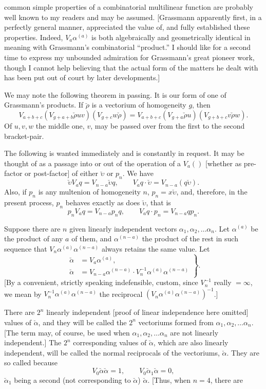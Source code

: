 \documentclass[11pt]{article}
\begin{document}
common simple properties of a combinatorial multilinear function are probably well known to my readers and may be assumed. [Grassmann apparently first, in a perfectly general manner, appreciated the value of, and fully established these properties. Indeed, $V_a\alpha^{(a)}$ is both algebraically and geometrically identical in meaning with Grassmann's combinatorial ``product.'' I should like for a second time to express my unbounded admiration for Grassmann's great pioneer work, though I cannot help believing that the actual form of the matters he dealt with has been put out of court by later developments.]

\indent We may note the following theorem in passing. It is our form of one of Grassmann's products. If $\breve\rho$ is a vectorium of homogeneity $g$, then
\[V_{a+b+c}(V_{g+a+b}\breve\rho uv)(V_{g+c}w\breve\rho)=V_{a+b+c}(V_{g+a}\breve\rho u)(V_{g+b+c}v\breve\rho w).\]
Of $u,v,w$ the middle one, $v$, may be passed over from the first to the second bracket-pair.


\indent The following is wanted immediately and is constantly in request. It may be thought of as a passage into or out of the operation of a $V_a()$ [whether as pre-factor or post-factor] of either $\breve\upsilon$ or $p_n$. We have
\[\breve\upsilon V_aq=V_{n-a}\breve\upsilon q,\qquad V_aq\cdot\breve\upsilon=V_{n-a}(q\breve\upsilon).\]
Also, if $p_n$ is any multenion of homogeneity $n$, $p_n=x\breve\upsilon$, and, therefore, in the present process, $p_n$ behaves exactly as does $\breve\upsilon$, that is
\[p_nV_aq=V_{n-a}p_nq,\qquad V_aq\cdot p_n=V_{n-a}qp_n.\]

\indent Suppose there are $n$ given linearly independent vectors $\alpha_1,\alpha_2,\ldots\alpha_n$. Let $\alpha^{(a)}$ be the product of any $a$ of them, and $\alpha^{(n-a)}$ the product of the rest in such sequence that $V_n\alpha^{(a)}\alpha^{(n-a)}$ always retains the same value. Let
\begin{equation}\left.\begin{aligned}\breve\alpha&=V_a\alpha^{(a)},\\\breve\alpha&=V_{n-a}\alpha^{(n-a)}\cdot V_n^{-1}\alpha^{(a)}\alpha^{(n-a)}\end{aligned}\right\}.\tag{1}\end{equation}
[By a convenient, strictly speaking indefensible, custom, since $V_n^{-1}$ really $=\infty$, we mean by $V_n^{-1}\alpha^{(a)}\alpha^{(n-a)}$ the reciprocal $(V_n\alpha^{(a)}\alpha^{(n-a)})^{-1}$.]

\indent There are $2^n$ linearly independent [proof of linear independence here omitted] values of $\breve\alpha$, and they will be called the $2^n$ vectoriums formed from $\alpha_1,\alpha_2,\ldots\alpha_n$. [The term may, of course, be used when $\alpha_1,\alpha_2,\ldots\alpha_n$ are not linearly independent.] The $2^n$ corresponding values of $\breve\alpha$, which are also linearly independent, will be called the normal reciprocals of the vectoriums, $\breve\alpha$. They are so called because
\[V_0\breve\alpha\breve\alpha=1,\qquad V_0\breve\alpha_1\breve\alpha=0,\]
$\breve\alpha_1$ being a second (not corresponding to $\breve\alpha$) $\breve\alpha$. [Thus, when $n=4$, there are
\end{document}
